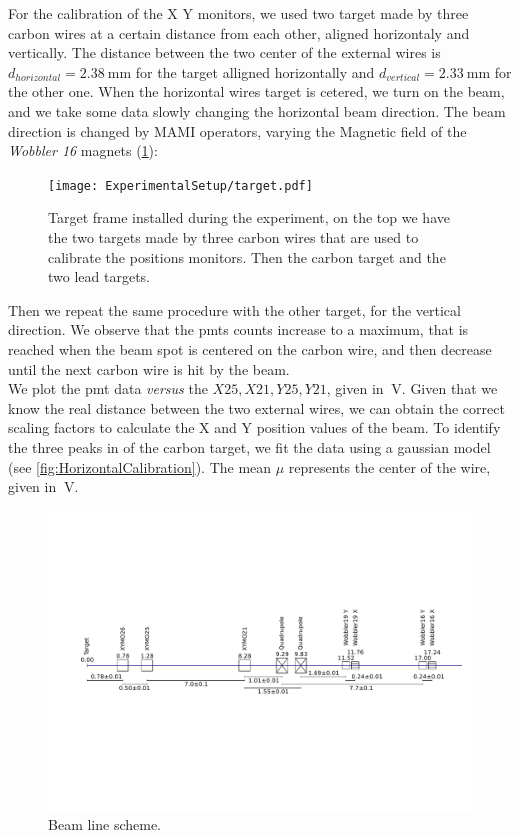 For the calibration of the X Y monitors, we used two target made by three carbon wires at a certain distance from each other, aligned horizontaly and vertically. The distance between the two center of the external wires is $ d_{horizontal} = \SI{2.38}{\milli \meter}$ for the target alligned horizontally and $d_{vertical} = \SI{2.33}{\milli \meter}$ for the other one.
When the horizontal wires target is cetered, we turn on the beam, and we take some data slowly changing the horizontal beam direction. The beam direction is changed by MAMI operators, varying the Magnetic field of the \textit{Wobbler 16} magnets (\ref{fig:BeamLine}):

\begin{figure}
\centering
\texttt{[image: ExperimentalSetup/target.pdf]}
\caption{Target frame installed during the experiment, on the top we have the two targets made by three carbon wires that are used to calibrate the positions monitors. Then the carbon target and the two lead targets.}
\end{figure}

 Then we repeat the same procedure with the other target, for the vertical direction. We observe that the pmts counts increase to a maximum, that is reached when the beam spot is centered on the carbon wire, and then decrease until the next carbon wire is hit by the beam.\\
We plot the pmt data \textit{versus} the $X25,X21,Y25,Y21$, given in $\SI{}{\volt}$. 
Given that we know the real distance between the two external wires, we can obtain the correct scaling factors to calculate the X and Y position values ​​of the beam. To identify the three peaks in of the carbon target, we fit the data using a gaussian model (see \ref{fig:HorizontalCalibration}). The mean $\mu$ represents the center of the wire, given in $\SI{}{\volt}$.

\begin{figure}[hbtp]
\centering
\includegraphics[scale=0.4]{figures/XYMOCalibBeamLine.svg.pdf}
\caption{Beam line scheme.}
\label{fig:BeamLine}
\end{figure}

